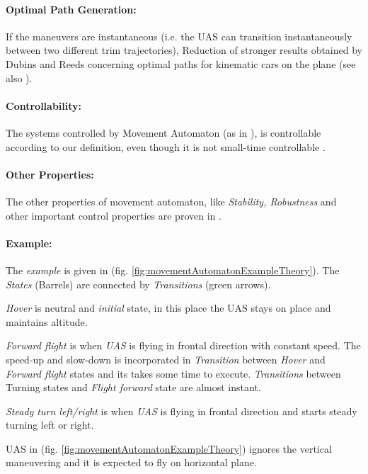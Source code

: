 \paragraph{Optimal Path Generation:} If the maneuvers are instantaneous (i.e. the UAS can transition instantaneously between two different trim trajectories), Reduction of stronger results obtained by Dubins \cite{dubins1957curves} and Reeds \cite{reeds1990optimal} concerning optimal paths for kinematic cars on the plane (see also \cite{soueres1998optimal}). 

\paragraph{Controllability:} The systems controlled by Movement Automaton (as in \cite{lavalle1998rapidly}), is controllable according to our definition, even though it is not
small-time controllable \cite{sussmann1983lie}.

\paragraph{Other Properties:} The other properties of movement automaton, like \emph{Stability, Robustness} and other important control properties are proven in \cite{frazzoli2001robust}.



\paragraph{Example:} The \emph{example} is given in (fig. \ref{fig:movementAutomatonExampleTheory}). The \emph{States} (Barrels) are connected by \emph{Transitions} (green arrows).

\emph{Hover} is neutral and \emph{initial} state, in this place the UAS stays on place and maintains altitude.

\emph{Forward flight} is when \emph{UAS} is flying in frontal direction with constant speed. The speed-up and slow-down is incorporated in \emph{Transition} between \emph{Hover} and \emph{Forward flight} states and its takes some time to execute. \emph{Transitions} between Turning states and \emph{Flight forward} state are almost instant. 

\emph{Steady turn left/right} is when \emph{UAS} is flying in frontal direction and starts steady turning left or right. 

\begin{note}
UAS in (fig. \ref{fig:movementAutomatonExampleTheory}) ignores the vertical maneuvering and it is expected to fly on horizontal plane.
\end{note}


